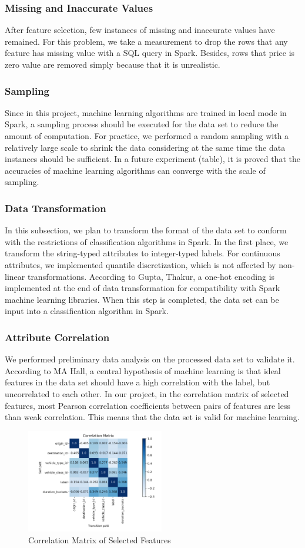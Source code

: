 \documentclass[conference]{IEEEtran}
\begin{document}
\subsubsection{Missing and Inaccurate Values}
After feature selection, few instances of missing and inaccurate values have remained. For this problem, we take a measurement to drop the rows that any feature has missing value with a SQL query in Spark. Besides, rows that price is zero value are removed simply because that it is unrealistic.
\subsubsection{Sampling}
Since in this project, machine learning algorithms are trained in local mode in Spark, a sampling process should be executed for the data set to reduce the amount of computation. For practice, we performed a random sampling with a relatively large scale to shrink the data considering at the same time the data instances should be sufficient. In a future experiment (table), it is proved that the accuracies of machine learning algorithms can converge with the scale of sampling.
\subsubsection{Data Transformation}
In this subsection, we plan to transform the format of the data set to conform with the restrictions of classification algorithms in Spark. In the first place, we transform the string-typed attributes to integer-typed labels. For continuous attributes, we implemented quantile discretization, which is not affected by non-linear transformations\cite{b22}. According to Gupta, Thakur\cite{b23}, a one-hot encoding is implemented at the end of data transformation for compatibility with Spark machine learning libraries. When this step is completed, the data set can be input into a classification algorithm in Spark.
\subsubsection{Attribute Correlation}
We performed preliminary data analysis on the processed data set to validate it. According to MA Hall\cite{b24}, a central hypothesis of machine learning is that ideal features in the data set should have a high correlation with the label, but uncorrelated to each other. In our project, in the correlation matrix of selected features, most Pearson correlation coefficients between pairs of features are less than weak correlation. This means that the data set is valid for machine learning.
\begin{figure}[ht]
\centering
\includegraphics[width=6cm]{01.png}
\caption{Correlation Matrix of Selected Features}
\end{figure}
\end{document}
